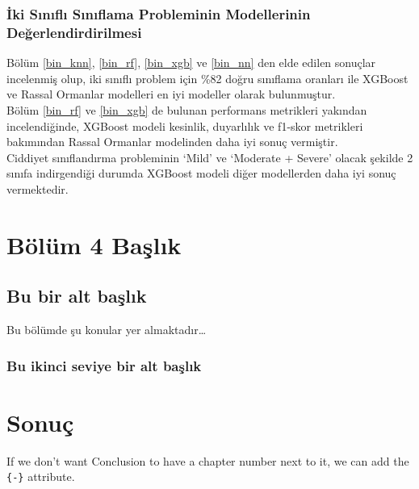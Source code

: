 \documentclass[12pt,twoside]{deuthesis}
\begin{document}
\hypertarget{iki-sux131nux131flux131-sux131nux131flama-probleminin-modellerinin-deux11ferlendirdirilmesi}{%
\subsection{İki Sınıflı Sınıflama Probleminin Modellerinin Değerlendirdirilmesi}\label{iki-sux131nux131flux131-sux131nux131flama-probleminin-modellerinin-deux11ferlendirdirilmesi}}

Bölüm \ref{bin_knn}, \ref{bin_rf}, \ref{bin_xgb} ve \ref{bin_nn} den elde edilen sonuçlar incelenmiş olup, iki sınıflı problem için \%82 doğru sınıflama oranları ile XGBoost ve Rassal Ormanlar modelleri en iyi modeller olarak bulunmuştur.\\
Bölüm \ref{bin_rf} ve \ref{bin_xgb} de bulunan performans metrikleri yakından incelendiğinde, XGBoost modeli kesinlik, duyarlılık ve f1-skor metrikleri bakımından Rassal Ormanlar modelinden daha iyi sonuç vermiştir.\\
Ciddiyet sınıflandırma probleminin `Mild' ve `Moderate + Severe' olacak şekilde 2 sınıfa indirgendiği durumda XGBoost modeli diğer modellerden daha iyi sonuç vermektedir.

\hypertarget{Bolum4}{%
\chapter{Bölüm 4 Başlık}\label{Bolum4}}

\hypertarget{bu-bir-alt-baux15flux131k}{%
\section{Bu bir alt başlık}\label{bu-bir-alt-baux15flux131k}}

Bu bölümde şu konular yer almaktadır\ldots{}

\hypertarget{bu-ikinci-seviye-bir-alt-baux15flux131k}{%
\subsection{Bu ikinci seviye bir alt başlık}\label{bu-ikinci-seviye-bir-alt-baux15flux131k}}

\hypertarget{sonuuxe7}{%
\chapter*{Sonuç}\label{sonuuxe7}}

If we don't want Conclusion to have a chapter number next to it, we can add the \texttt{\{-\}} attribute.
\end{document}
